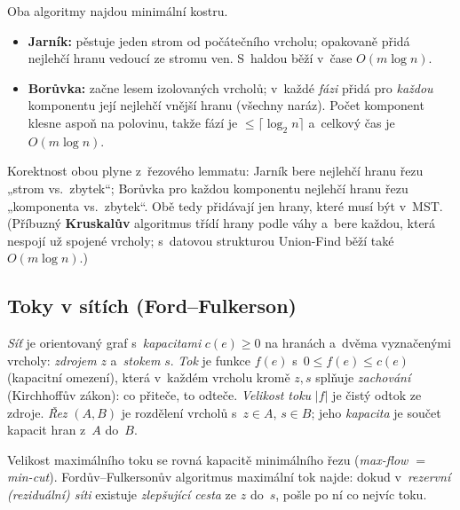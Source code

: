 \documentclass[11pt,a4paper]{article}
\begin{document}
\begin{veta}
Oba algoritmy najdou minimální kostru.
\begin{itemize}
  \item \textbf{Jarník:} pěstuje jeden strom od počátečního vrcholu; opakovaně přidá nejlehčí hranu vedoucí ze stromu ven. S~haldou běží v~čase $O(m\log n)$.
  \item \textbf{Borůvka:} začne lesem izolovaných vrcholů; v~každé \emph{fázi} přidá pro \emph{každou} komponentu její nejlehčí vnější hranu (všechny naráz). Počet komponent klesne aspoň na polovinu, takže fází je $\le\lceil\log_2 n\rceil$ a~celkový čas je $O(m\log n)$.
\end{itemize}
\end{veta}

\begin{intuice}
Korektnost obou plyne z~řezového lemmatu: Jarník bere nejlehčí hranu řezu „strom vs.\ zbytek``; Borůvka pro každou komponentu nejlehčí hranu řezu „komponenta vs.\ zbytek``. Obě tedy přidávají jen hrany, které musí být v~MST. (Příbuzný \textbf{Kruskalův} algoritmus třídí hrany podle váhy a~bere každou, která nespojí už spojené vrcholy; s~datovou strukturou Union-Find běží také $O(m\log n)$.)
\end{intuice}

\subsection{Toky v sítích (Ford--Fulkerson)}

\begin{definice}
\emph{Síť} je orientovaný graf s~\emph{kapacitami} $c(e)\ge0$ na hranách a~dvěma vyznačenými vrcholy: \emph{zdrojem} $z$ a~\emph{stokem} $s$. \emph{Tok} je funkce $f(e)$ s~$0\le f(e)\le c(e)$ (kapacitní omezení), která v~každém vrcholu kromě $z,s$ splňuje \emph{zachování} (Kirchhoffův zákon): co přiteče, to odteče. \emph{Velikost toku} $|f|$ je čistý odtok ze zdroje. \emph{Řez} $(A,B)$ je rozdělení vrcholů s~$z\in A$, $s\in B$; jeho \emph{kapacita} je součet kapacit hran z~$A$ do~$B$.
\end{definice}

\begin{veta}
Velikost maximálního toku se rovná kapacitě minimálního řezu (\emph{max-flow $=$ min-cut}). Fordův--Fulkersonův algoritmus maximální tok najde: dokud v~\emph{rezervní (reziduální) síti} existuje \emph{zlepšující cesta} ze $z$ do~$s$, pošle po ní co nejvíc toku.
\end{veta}
\end{document}
